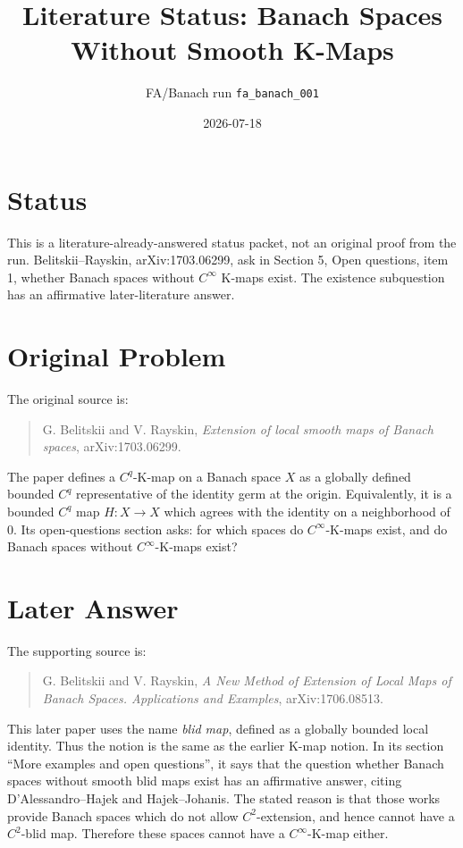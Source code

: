 \documentclass[11pt]{article}
\title{Literature Status: Banach Spaces Without Smooth K-Maps}
\author{FA/Banach run \texttt{fa\_banach\_001}}
\date{2026-07-18}
\begin{document}
\maketitle

\section*{Status}

This is a literature-already-answered status packet, not an original proof
from the run.  Belitskii--Rayskin, arXiv:1703.06299, ask in Section 5,
Open questions, item 1, whether Banach spaces without \(C^\infty\) K-maps
exist.  The existence subquestion has an affirmative later-literature
answer.

\section*{Original Problem}

The original source is:
\begin{quote}
G. Belitskii and V. Rayskin,
\emph{Extension of local smooth maps of Banach spaces},
arXiv:1703.06299.
\end{quote}

The paper defines a \(C^q\)-K-map on a Banach space \(X\) as a globally
defined bounded \(C^q\) representative of the identity germ at the origin.
Equivalently, it is a bounded \(C^q\) map \(H:X\to X\) which agrees with
the identity on a neighborhood of \(0\).  Its open-questions section asks:
for which spaces do \(C^\infty\)-K-maps exist, and do Banach spaces without
\(C^\infty\)-K-maps exist?

\section*{Later Answer}

The supporting source is:
\begin{quote}
G. Belitskii and V. Rayskin,
\emph{A New Method of Extension of Local Maps of Banach Spaces.
Applications and Examples},
arXiv:1706.08513.
\end{quote}

This later paper uses the name \emph{blid map}, defined as a globally
bounded local identity.  Thus the notion is the same as the earlier
K-map notion.  In its section ``More examples and open questions'', it says
that the question whether Banach spaces without smooth blid maps exist has
an affirmative answer, citing D'Alessandro--Hajek and Hajek--Johanis.  The
stated reason is that those works provide Banach spaces which do not allow
\(C^2\)-extension, and hence cannot have a \(C^2\)-blid map.  Therefore
these spaces cannot have a \(C^\infty\)-K-map either.
\end{document}
